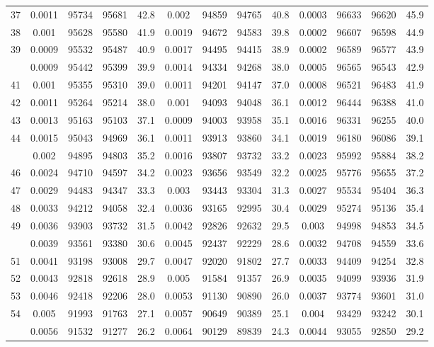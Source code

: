 \documentclass[
  14pt,
]{article}
\begin{document}
\begin{longtable}[t]{lcccccccccccc}
37 & 0.0011 & 95734 & 95681 & 42.8 & 0.002 & 94859 & 94765 & 40.8 & 0.0003 & 96633 & 96620 & 45.9\\
38 & 0.001 & 95628 & 95580 & 41.9 & 0.0019 & 94672 & 94583 & 39.8 & 0.0002 & 96607 & 96598 & 44.9\\
39 & 0.0009 & 95532 & 95487 & 40.9 & 0.0017 & 94495 & 94415 & 38.9 & 0.0002 & 96589 & 96577 & 43.9\\
\addlinespace
40 & 0.0009 & 95442 & 95399 & 39.9 & 0.0014 & 94334 & 94268 & 38.0 & 0.0005 & 96565 & 96543 & 42.9\\
41 & 0.001 & 95355 & 95310 & 39.0 & 0.0011 & 94201 & 94147 & 37.0 & 0.0008 & 96521 & 96483 & 41.9\\
42 & 0.0011 & 95264 & 95214 & 38.0 & 0.001 & 94093 & 94048 & 36.1 & 0.0012 & 96444 & 96388 & 41.0\\
43 & 0.0013 & 95163 & 95103 & 37.1 & 0.0009 & 94003 & 93958 & 35.1 & 0.0016 & 96331 & 96255 & 40.0\\
44 & 0.0015 & 95043 & 94969 & 36.1 & 0.0011 & 93913 & 93860 & 34.1 & 0.0019 & 96180 & 96086 & 39.1\\
\addlinespace
45 & 0.002 & 94895 & 94803 & 35.2 & 0.0016 & 93807 & 93732 & 33.2 & 0.0023 & 95992 & 95884 & 38.2\\
46 & 0.0024 & 94710 & 94597 & 34.2 & 0.0023 & 93656 & 93549 & 32.2 & 0.0025 & 95776 & 95655 & 37.2\\
47 & 0.0029 & 94483 & 94347 & 33.3 & 0.003 & 93443 & 93304 & 31.3 & 0.0027 & 95534 & 95404 & 36.3\\
48 & 0.0033 & 94212 & 94058 & 32.4 & 0.0036 & 93165 & 92995 & 30.4 & 0.0029 & 95274 & 95136 & 35.4\\
49 & 0.0036 & 93903 & 93732 & 31.5 & 0.0042 & 92826 & 92632 & 29.5 & 0.003 & 94998 & 94853 & 34.5\\
\addlinespace
50 & 0.0039 & 93561 & 93380 & 30.6 & 0.0045 & 92437 & 92229 & 28.6 & 0.0032 & 94708 & 94559 & 33.6\\
51 & 0.0041 & 93198 & 93008 & 29.7 & 0.0047 & 92020 & 91802 & 27.7 & 0.0033 & 94409 & 94254 & 32.8\\
52 & 0.0043 & 92818 & 92618 & 28.9 & 0.005 & 91584 & 91357 & 26.9 & 0.0035 & 94099 & 93936 & 31.9\\
53 & 0.0046 & 92418 & 92206 & 28.0 & 0.0053 & 91130 & 90890 & 26.0 & 0.0037 & 93774 & 93601 & 31.0\\
54 & 0.005 & 91993 & 91763 & 27.1 & 0.0057 & 90649 & 90389 & 25.1 & 0.004 & 93429 & 93242 & 30.1\\
\addlinespace
55 & 0.0056 & 91532 & 91277 & 26.2 & 0.0064 & 90129 & 89839 & 24.3 & 0.0044 & 93055 & 92850 & 29.2\\

\end{longtable}
\end{document}
